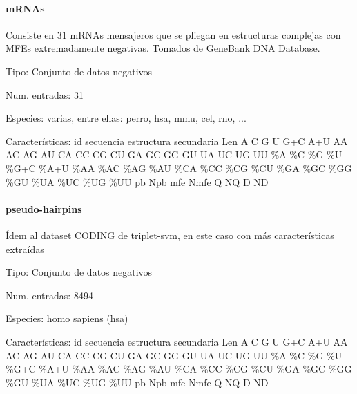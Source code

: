 \documentclass[12pt,bibliography=openstyle,DIV=12,parskip=half-]{scrartcl}
\begin{document}
\paragraph{mRNAs}
Consiste en 31 mRNAs mensajeros que se pliegan en estructuras
complejas con MFEs extremadamente negativas. Tomados de GeneBank DNA
Database.
\begin{description*}
\item[Tipo:] Conjunto de datos negativos
\item[Num. entradas:] 31
\item[Especies:] varias, entre ellas: perro, hsa, mmu, cel, rno, ...
\item[Características:] id \quad secuencia \quad estructura secundaria
  \quad Len \quad A \quad C \quad G \quad U \quad G+C \quad A+U \quad
  AA \quad AC \quad AG \quad AU \quad CA \quad CC \quad CG \quad CU
  \quad GA \quad GC \quad GG \quad GU \quad UA \quad UC \quad UG \quad
  UU \quad \%A \quad \%C \quad \%G \quad \%U \quad \%G+C \quad \%A+U
  \quad \%AA \quad \%AC \quad \%AG \quad \%AU \quad \%CA \quad \%CC
  \quad \%CG \quad \%CU \quad \%GA \quad \%GC \quad \%GG \quad \%GU
  \quad \%UA \quad \%UC \quad \%UG \quad \%UU \quad pb \quad Npb \quad
  mfe \quad Nmfe \quad Q \quad NQ \quad D \quad ND \quad
\end{description*}

\paragraph{pseudo-hairpins}
Ídem al dataset CODING de triplet-svm, en este caso con más
características extraídas
\begin{description*}
\item[Tipo:] Conjunto de datos negativos
\item[Num. entradas:] 8494
\item[Especies:] homo sapiens (hsa)
\item[Características:] id \quad secuencia \quad estructura secundaria
  \quad Len \quad A \quad C \quad G \quad U \quad G+C \quad A+U \quad
  AA \quad AC \quad AG \quad AU \quad CA \quad CC \quad CG \quad CU
  \quad GA \quad GC \quad GG \quad GU \quad UA \quad UC \quad UG \quad
  UU \quad \%A \quad \%C \quad \%G \quad \%U \quad \%G+C \quad \%A+U
  \quad \%AA \quad \%AC \quad \%AG \quad \%AU \quad \%CA \quad \%CC
  \quad \%CG \quad \%CU \quad \%GA \quad \%GC \quad \%GG \quad \%GU
  \quad \%UA \quad \%UC \quad \%UG \quad \%UU \quad pb \quad Npb \quad
  mfe \quad Nmfe \quad Q \quad NQ \quad D \quad ND \quad
\end{description*}
%
%
%
%
%
\end{document}
